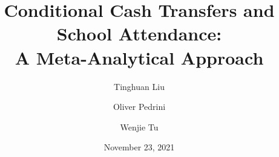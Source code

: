 \documentclass{beamer}
\title[Meta Analysis]{Conditional Cash Transfers and School Attendance:\\A Meta-Analytical Approach} %
\author{Tinghuan Liu\and Oliver Pedrini \and Wenjie Tu} %
\institute[UZH] %
{
Department of Economics, University of Zurich \\ %
\medskip
}
\date{November 23, 2021} %
\begin{document}
\begin{frame}
\titlepage %
\end{frame}

\end{document}
